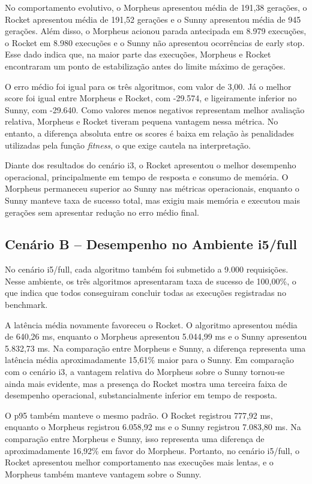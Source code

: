 No comportamento evolutivo, o Morpheus apresentou média de 191,38 gerações, o Rocket apresentou média de 191,52 gerações e o Sunny apresentou média de 945 gerações. Além disso, o Morpheus acionou parada antecipada em 8.979 execuções, o Rocket em 8.980 execuções e o Sunny não apresentou ocorrências de early stop. Esse dado indica que, na maior parte das execuções, Morpheus e Rocket encontraram um ponto de estabilização antes do limite máximo de gerações.

O erro médio foi igual para os três algoritmos, com valor de 3,00. Já o melhor score foi igual entre Morpheus e Rocket, com -29.574, e ligeiramente inferior no Sunny, com -29.640. Como valores menos negativos representam melhor avaliação relativa, Morpheus e Rocket tiveram pequena vantagem nessa métrica. No entanto, a diferença absoluta entre os scores é baixa em relação às penalidades utilizadas pela função \textit{fitness}, o que exige cautela na interpretação.

Diante dos resultados do cenário i3, o Rocket apresentou o melhor desempenho operacional, principalmente em tempo de resposta e consumo de memória. O Morpheus permaneceu superior ao Sunny nas métricas operacionais, enquanto o Sunny manteve taxa de sucesso total, mas exigiu mais memória e executou mais gerações sem apresentar redução no erro médio final.

\subsection{Cenário B -- Desempenho no Ambiente i5/full}
\label{sec:cenario-b-i5-full}

No cenário i5/full, cada algoritmo também foi submetido a 9.000 requisições. Nesse ambiente, os três algoritmos apresentaram taxa de sucesso de 100,00\%, o que indica que todos conseguiram concluir todas as execuções registradas no benchmark.

A latência média novamente favoreceu o Rocket. O algoritmo apresentou média de 640,26 ms, enquanto o Morpheus apresentou 5.044,99 ms e o Sunny apresentou 5.832,73 ms. Na comparação entre Morpheus e Sunny, a diferença representa uma latência média aproximadamente 15,61\% maior para o Sunny. Em comparação com o cenário i3, a vantagem relativa do Morpheus sobre o Sunny tornou-se ainda mais evidente, mas a presença do Rocket mostra uma terceira faixa de desempenho operacional, substancialmente inferior em tempo de resposta.

O p95 também manteve o mesmo padrão. O Rocket registrou 777,92 ms, enquanto o Morpheus registrou 6.058,92 ms e o Sunny registrou 7.083,80 ms. Na comparação entre Morpheus e Sunny, isso representa uma diferença de aproximadamente 16,92\% em favor do Morpheus. Portanto, no cenário i5/full, o Rocket apresentou melhor comportamento nas execuções mais lentas, e o Morpheus também manteve vantagem sobre o Sunny.

